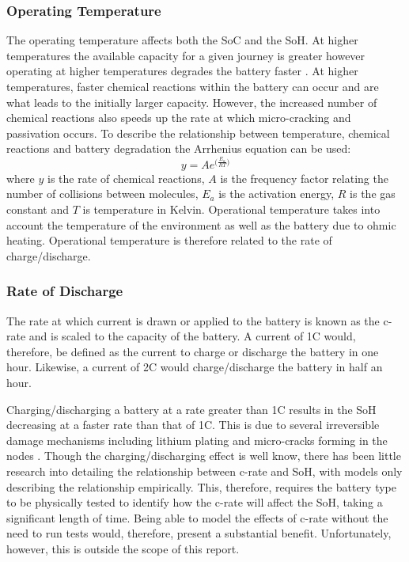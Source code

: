 \documentclass[a4paper, 10pt]{article}
\numberwithin{equation}{section}
\begin{document}

\subsubsection{Operating Temperature}

The operating temperature affects both the SoC and the SoH. At higher temperatures the available capacity for a given journey is greater however operating at higher temperatures degrades the battery faster \cite{web:batt_life}\cite{report:Arrhenius}. At higher temperatures, faster chemical reactions within the battery can occur and are what leads to the initially larger capacity. However, the increased number of chemical reactions also speeds up the rate at which micro-cracking and passivation occurs. 
To describe the relationship between temperature, chemical reactions and battery degradation the Arrhenius equation can be used:
\begin{equation}
\label{eq:Arr}
    y=Ae^{\big(\frac{E_a}{RT}\big)}
\end{equation}
where $y$ is the rate of chemical reactions, $A$ is the frequency factor relating the number of collisions between molecules, $E_a$ is the activation energy, $R$ is the gas constant and $T$ is temperature in Kelvin. Operational temperature takes into account the temperature of the environment as well as the battery due to ohmic heating. Operational temperature is therefore related to the rate of charge/discharge.

\subsubsection{Rate of Discharge}\label{RoD}

The rate at which current is drawn or applied to the battery is known as the c-rate and is scaled to the capacity of the battery. A current of 1C would, therefore, be defined as the current to charge or discharge the battery in one hour. Likewise, a current of 2C would charge/discharge the battery in half an hour. 

Charging/discharging a battery at a rate greater than 1C results in the SoH decreasing at a faster rate than that of 1C. This is due to several irreversible damage mechanisms including lithium plating and micro-cracks forming in the nodes \cite{web:batt_life}. Though the charging/discharging  effect is well know, there has been little research into detailing the relationship between c-rate and SoH, with models only describing the relationship empirically. This, therefore, requires the battery type to be physically tested to identify how the c-rate will affect the SoH, taking a significant length of time. Being able to model the effects of c-rate without the need to run tests would, therefore, present a substantial benefit. Unfortunately, however, this is outside the scope of this report.
\end{document}

